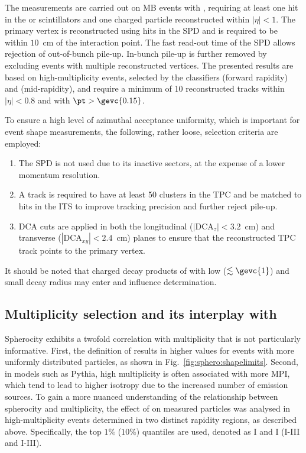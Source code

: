 The measurements are carried out on MB events with \INELgtO, requiring at least one hit in the \VOA or \VOC scintillators and one charged particle reconstructed within $|\eta|<1$. The primary vertex is reconstructed using hits in the SPD and is required to be within $10$~cm of the interaction point. The fast read-out time of the SPD allows rejection of out-of-bunch pile-up. In-bunch pile-up is further removed by excluding events with multiple reconstructed vertices. The presented results are based on high-multiplicity events, selected by the classifiers \VOM (forward rapidity) and \tracklet (mid-rapidity), and require a minimum of 10 reconstructed tracks within $|\eta|<0.8$ and with $\pt>\gevc{0.15}$.

To ensure a high level of azimuthal acceptance uniformity, which is important for event shape measurements, the following, rather loose, selection criteria are employed:
\begin{enumerate}
\item The SPD is not used due to its inactive sectors, at the expense of a lower momentum resolution.
\item A track is required to have at least 50 clusters in the TPC and be matched to hits in the ITS to improve tracking precision and further reject  pile-up.
\item DCA cuts are applied in both the longitudinal ($|\mathrm{DCA}_z|<3.2$~cm) and transverse ($|\mathrm{DCA}_{xy}|<2.4$~cm) planes to ensure that the reconstructed TPC track points to the primary vertex.
\end{enumerate}
It should be noted that charged decay products of \VOs with low \pt ($\lesssim \gevc{1}$) and small decay radius may enter and influence \SOPT determination.

\subsection{Multiplicity selection and its interplay with \SOPT}

Spherocity exhibits a twofold correlation with multiplicity that is not particularly informative. First, the definition of \SOPT results in higher values for events with more uniformly distributed particles, as shown in Fig.~\ref{fig:sphero:shapelimits}. Second, in models such as Pythia, high multiplicity is often associated with more MPI, which tend to lead to higher isotropy due to the increased number of emission sources. To gain a more nuanced understanding of the relationship between spherocity and multiplicity, the effect of \SOPT on measured particles was analysed in high-multiplicity events determined in two distinct rapidity regions, as described above. Specifically, the top $1\%$ ($10\%$) quantiles are used, denoted as \VOM I and \NSPD I (\VOM I-III and \NSPD I-III).

